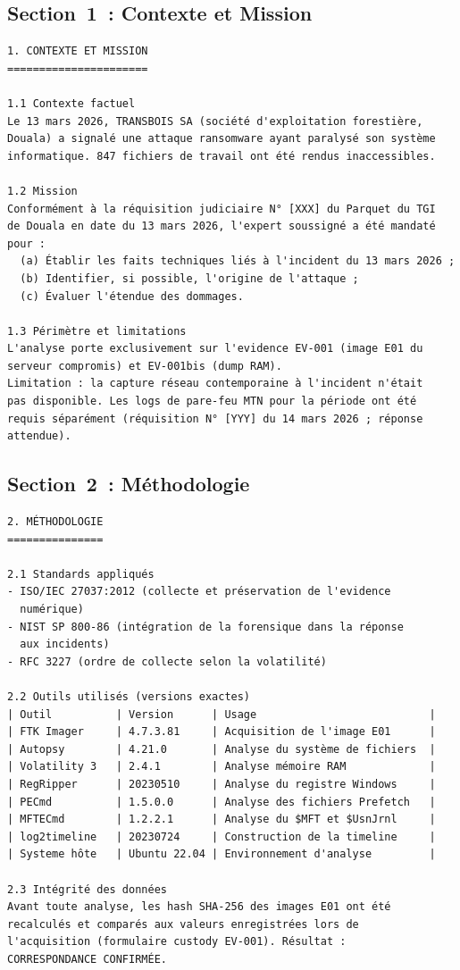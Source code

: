 \subsection{Section~1~: Contexte et Mission}

\begin{lstlisting}[language=bash_forensique,
    caption={Section Contexte et Mission -- exemple MVOM}]
1. CONTEXTE ET MISSION
======================

1.1 Contexte factuel
Le 13 mars 2026, TRANSBOIS SA (société d'exploitation forestière,
Douala) a signalé une attaque ransomware ayant paralysé son système
informatique. 847 fichiers de travail ont été rendus inaccessibles.

1.2 Mission
Conformément à la réquisition judiciaire N° [XXX] du Parquet du TGI
de Douala en date du 13 mars 2026, l'expert soussigné a été mandaté
pour :
  (a) Établir les faits techniques liés à l'incident du 13 mars 2026 ;
  (b) Identifier, si possible, l'origine de l'attaque ;
  (c) Évaluer l'étendue des dommages.

1.3 Périmètre et limitations
L'analyse porte exclusivement sur l'evidence EV-001 (image E01 du
serveur compromis) et EV-001bis (dump RAM).
Limitation : la capture réseau contemporaine à l'incident n'était
pas disponible. Les logs de pare-feu MTN pour la période ont été
requis séparément (réquisition N° [YYY] du 14 mars 2026 ; réponse
attendue).
\end{lstlisting}

\subsection{Section~2~: Méthodologie}

\begin{lstlisting}[language=bash_forensique,
    caption={Section Méthodologie -- exemple}]
2. MÉTHODOLOGIE
===============

2.1 Standards appliqués
- ISO/IEC 27037:2012 (collecte et préservation de l'evidence
  numérique)
- NIST SP 800-86 (intégration de la forensique dans la réponse
  aux incidents)
- RFC 3227 (ordre de collecte selon la volatilité)

2.2 Outils utilisés (versions exactes)
| Outil          | Version      | Usage                           |
| FTK Imager     | 4.7.3.81     | Acquisition de l'image E01      |
| Autopsy        | 4.21.0       | Analyse du système de fichiers  |
| Volatility 3   | 2.4.1        | Analyse mémoire RAM             |
| RegRipper      | 20230510     | Analyse du registre Windows     |
| PECmd          | 1.5.0.0      | Analyse des fichiers Prefetch   |
| MFTECmd        | 1.2.2.1      | Analyse du $MFT et $UsnJrnl     |
| log2timeline   | 20230724     | Construction de la timeline     |
| Systeme hôte   | Ubuntu 22.04 | Environnement d'analyse         |

2.3 Intégrité des données
Avant toute analyse, les hash SHA-256 des images E01 ont été
recalculés et comparés aux valeurs enregistrées lors de
l'acquisition (formulaire custody EV-001). Résultat :
CORRESPONDANCE CONFIRMÉE.
\end{lstlisting}

